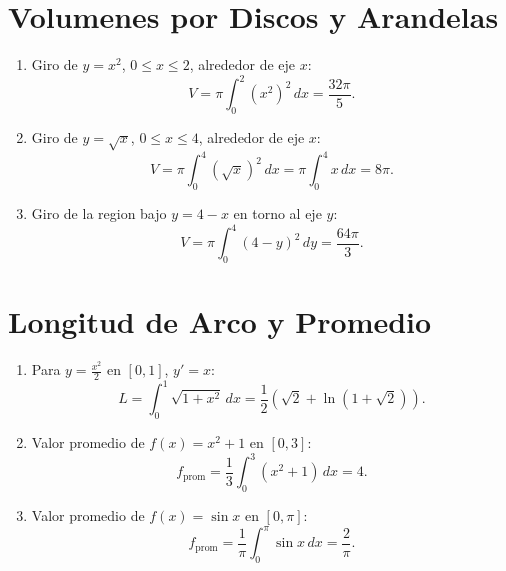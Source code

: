 \documentclass[12pt,a4paper]{article}
\begin{document}
\section{Volumenes por Discos y Arandelas}
\begin{enumerate}
    \item Giro de $y=x^2$, $0\le x\le 2$, alrededor de eje $x$:
    $$V=\pi\int_0^2 (x^2)^2\,dx=\frac{32\pi}{5}.$$

    \item Giro de $y=\sqrt{x}$, $0\le x\le 4$, alrededor de eje $x$:
    $$V=\pi\int_0^4 (\sqrt{x})^2\,dx=\pi\int_0^4 x\,dx=8\pi.$$

    \item Giro de la region bajo $y=4-x$ en torno al eje $y$:
    $$V=\pi\int_0^4 (4-y)^2\,dy=\frac{64\pi}{3}.$$
\end{enumerate}

\section{Longitud de Arco y Promedio}
\begin{enumerate}
    \item Para $y=\frac{x^2}{2}$ en $[0,1]$, $y'=x$:
    $$L=\int_0^1\sqrt{1+x^2}\,dx=\frac{1}{2}\left(\sqrt{2}+\ln(1+\sqrt{2})\right).$$

    \item Valor promedio de $f(x)=x^2+1$ en $[0,3]$:
    $$f_{\text{prom}}=\frac{1}{3}\int_0^3(x^2+1)\,dx=4.$$

    \item Valor promedio de $f(x)=\sin x$ en $[0,\pi]$:
    $$f_{\text{prom}}=\frac{1}{\pi}\int_0^{\pi}\sin x\,dx=\frac{2}{\pi}.$$
\end{enumerate}
\end{document}

